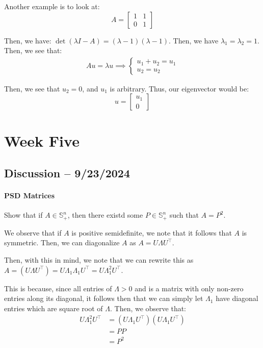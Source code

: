 \documentclass[openany]{book}
\begin{document}
\begin{example}
	Another example is to look at:
	\begin{equation*}
		A = \begin{bmatrix}
			 1 & 1 \\ 0 & 1
		\end{bmatrix}
	\end{equation*}

	Then, we have: $\det (\lambda I - A) = (\lambda - 1)(\lambda - 1)$. Then, we have $\lambda_1 = \lambda_2 = 1$. Then, we see that:
	\begin{align*}
		Au = \lambda u \implies \begin{cases}
			u_1 + u_2 = u_1 \\
			u_2 = u_2
		\end{cases}
	\end{align*}

	Then, we see that $u_2 = 0$, and $u_1$ is arbitrary. Thus, our eigenvector would be:
	\begin{equation*}
		u = \begin{bmatrix}
			u_1 \\ 0
		\end{bmatrix}
	\end{equation*}
\end{example}

\chapter{Week Five}
\section{Discussion -- 9/23/2024}
\subsubsection{PSD Matrices}
\begin{hw}
	Show that if $A \in \mathbb{S}_+^{n}$, then there existd some $P \in \mathbb{S}_+^{n}$ such that $A = P^{2}$.
\end{hw}
\begin{solution}
	We observe that if $A$ is positive semidefinite, we note that it follows that $A$ is symmetric. Then, we can diagonalize $A$ as $A = U \Lambda U^{\intercal}$.
	
	Then, with this in mind, we note that we can rewrite this as $A = (U \Lambda U^{\intercal}) = U \Lambda_1\Lambda_1 U^{\intercal} = U \Lambda_1^{2} U^{\intercal}$.
	
	This is because, since all entries of $\Lambda > 0$ and is a matrix with only non-zero entries along its diagonal, it follows then that we can simply let $\Lambda_1$ have diagonal entries which are square root of $\Lambda$. Then, we observe that:
	\begin{align*}
		U \Lambda_1^{2} U^{\intercal} &= (U\Lambda_1 U^{\intercal})(U\Lambda_1 U^{\intercal}) \\
		&= PP \\
		&= P^{2}
	\end{align*}
\end{solution}
\end{document}
